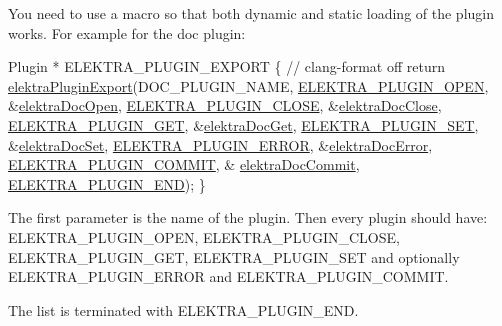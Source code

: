 You need to use a macro so that both dynamic and static loading of the plugin works. For example for the doc plugin\+: 
\begin{DoxyCodeInclude}
Plugin * ELEKTRA\_PLUGIN\_EXPORT
\{
        \textcolor{comment}{// clang-format off}
        \textcolor{keywordflow}{return} \hyperlink{group__plugin_ga8dd092048e972a3f0c9c9f54eb41576e}{elektraPluginExport}(DOC\_PLUGIN\_NAME,
                \hyperlink{kdbplugin_8h_afed89ef026fb0622918a5de020de7814ab7e2dcc6e79af21dd90d2bb62920551d}{ELEKTRA\_PLUGIN\_OPEN}, &\hyperlink{group__plugin_ga23c2eb3584e38a4d494eb8f91e5e3d8d}{elektraDocOpen},
                \hyperlink{kdbplugin_8h_afed89ef026fb0622918a5de020de7814a449e166b322550b3ad26efd4c46e49e3}{ELEKTRA\_PLUGIN\_CLOSE},       &\hyperlink{group__plugin_ga1236aefe5b2baf8b7bf636ba5aa9ea29}{elektraDocClose},
                \hyperlink{kdbplugin_8h_afed89ef026fb0622918a5de020de7814a3d5f4a887e68878f1cc3a75985194204}{ELEKTRA\_PLUGIN\_GET},   &\hyperlink{group__plugin_gacb69f3441c6d84241b4362f958fbe313}{elektraDocGet},
                \hyperlink{kdbplugin_8h_afed89ef026fb0622918a5de020de7814a85c9545261cf0bcc932616e67ea3b70a}{ELEKTRA\_PLUGIN\_SET},   &\hyperlink{group__plugin_gae65781a1deb34efc79c8cb9d9174842c}{elektraDocSet},
                \hyperlink{kdbplugin_8h_afed89ef026fb0622918a5de020de7814a89e027283d949dd78bb9c1fce1b19a10}{ELEKTRA\_PLUGIN\_ERROR},       &\hyperlink{group__plugin_gad74b35f558ac7c3262f6069c5c47dc79}{elektraDocError},
                \hyperlink{kdbplugin_8h_afed89ef026fb0622918a5de020de7814ad8ebee0e9b492518a042e5203336eca9}{ELEKTRA\_PLUGIN\_COMMIT},     &
      \hyperlink{group__plugin_ga52807469897b8acbada5bcc6b8c8ceab}{elektraDocCommit},
                \hyperlink{kdbplugin_8h_afed89ef026fb0622918a5de020de7814a64a0bc789482284d9fd27ce974e0959a}{ELEKTRA\_PLUGIN\_END});
\}
\end{DoxyCodeInclude}
 The first parameter is the name of the plugin. Then every plugin should have\+: {\ttfamily E\+L\+E\+K\+T\+R\+A\+\_\+\+P\+L\+U\+G\+I\+N\+\_\+\+O\+P\+EN}, {\ttfamily E\+L\+E\+K\+T\+R\+A\+\_\+\+P\+L\+U\+G\+I\+N\+\_\+\+C\+L\+O\+SE}, {\ttfamily E\+L\+E\+K\+T\+R\+A\+\_\+\+P\+L\+U\+G\+I\+N\+\_\+\+G\+ET}, {\ttfamily E\+L\+E\+K\+T\+R\+A\+\_\+\+P\+L\+U\+G\+I\+N\+\_\+\+S\+ET} and optionally {\ttfamily E\+L\+E\+K\+T\+R\+A\+\_\+\+P\+L\+U\+G\+I\+N\+\_\+\+E\+R\+R\+OR} and {\ttfamily E\+L\+E\+K\+T\+R\+A\+\_\+\+P\+L\+U\+G\+I\+N\+\_\+\+C\+O\+M\+M\+IT}.

The list is terminated with {\ttfamily E\+L\+E\+K\+T\+R\+A\+\_\+\+P\+L\+U\+G\+I\+N\+\_\+\+E\+ND}.

